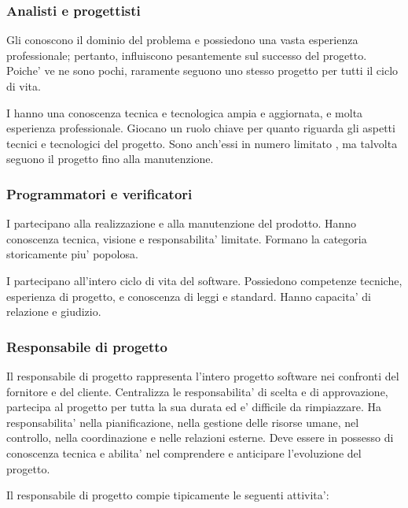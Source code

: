 \subsubsection{Analisti e progettisti}

Gli  conoscono il dominio del problema e possiedono una vasta
esperienza professionale; pertanto, influiscono pesantemente sul successo del
progetto. Poiche' ve ne sono pochi, raramente seguono uno stesso progetto per
tutti il ciclo di vita. 

I  hanno una conoscenza tecnica e tecnologica ampia e
aggiornata, e molta esperienza professionale. Giocano un ruolo chiave per quanto
riguarda gli aspetti tecnici e tecnologici del progetto. Sono anch'essi in
numero limitato , ma talvolta seguono il progetto fino alla
manutenzione.

\subsubsection{Programmatori e verificatori}

I  partecipano alla realizzazione e alla manutenzione del
prodotto. Hanno conoscenza tecnica, visione e responsabilita' limitate. Formano
la categoria storicamente piu' popolosa.

I  partecipano all'intero ciclo di vita del software.
Possiedono competenze tecniche, esperienza di progetto, e conoscenza di leggi e
standard. Hanno capacita' di relazione e giudizio.

\subsubsection{Responsabile di progetto}

Il responsabile di progetto rappresenta l'intero progetto software nei confronti
del fornitore e del cliente. Centralizza le responsabilita' di scelta e di
approvazione, partecipa al progetto per tutta la sua durata ed e' difficile da
rimpiazzare. Ha responsabilita' nella pianificazione, nella gestione delle
risorse umane, nel controllo, nella coordinazione e nelle relazioni esterne.
Deve essere in possesso di conoscenza tecnica e abilita' nel comprendere e
anticipare l'evoluzione del progetto.

Il responsabile di progetto compie tipicamente le seguenti attivita':

